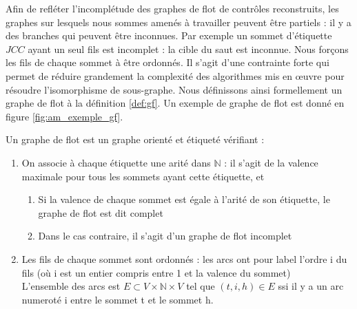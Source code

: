 Afin de refléter l'incomplétude des graphes de flot de contrôles reconstruits, les graphes sur lesquels nous sommes amenés à travailler peuvent être partiels : il y a des branches qui peuvent être inconnues.
Par exemple un sommet d'étiquette $JCC$ ayant un seul fils est incomplet : la cible du saut est inconnue.
Nous forçons les fils de chaque sommet à être ordonnés. Il s'agit d'une contrainte forte qui permet de réduire grandement la complexité des algorithmes mis en \oe uvre pour résoudre l'isomorphisme de sous-graphe.
Nous définissons ainsi formellement un graphe de flot à la définition \ref{def:gf}.
Un exemple de graphe de flot est donné en figure \ref{fig:am_exemple_gf}.

\begin{defi}\label{def:gf}
Un graphe de flot est un graphe orienté et étiqueté vérifiant :
\begin{enumerate}
\item On associe à chaque étiquette une arité dans $\mathbb{N}$ : il s'agit de la valence maximale pour tous les sommets ayant cette étiquette, et
 \begin{enumerate}
  \item Si la valence de chaque sommet est égale à l'arité de son étiquette, le graphe de flot est dit complet
  \item Dans le cas contraire, il s'agit d'un graphe de flot incomplet
 \end{enumerate}
 \item Les fils de chaque sommet sont ordonnés : les arcs ont pour label l'ordre i du fils (où i est un entier compris entre 1 et la valence du sommet)\\
       L'ensemble des arcs est $E\subset V\times \mathbb{N}\times V$ tel que $(t, i, h)\in E$ ssi il y a un arc numeroté i entre le sommet t et le sommet h.
\end{enumerate}
\end{defi}


